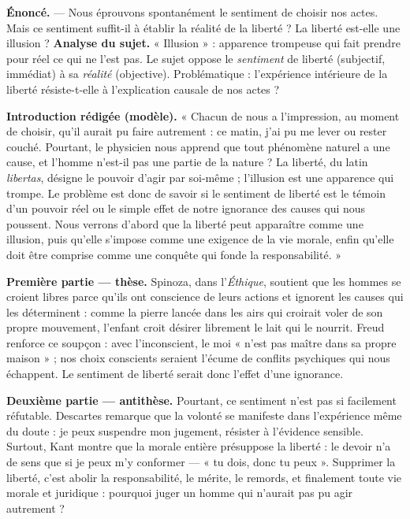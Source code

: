 \documentclass[11pt]{article}
\begin{document}
\begin{exoresolu}
\textbf{Énoncé.} — Nous éprouvons spontanément le sentiment de choisir nos actes. Mais ce sentiment suffit-il à établir la réalité de la liberté ? La liberté est-elle une illusion ?
\tcblower
\textbf{Analyse du sujet.} « Illusion » : apparence trompeuse qui fait prendre pour réel ce qui ne l'est pas. Le sujet oppose le \emph{sentiment} de liberté (subjectif, immédiat) à sa \emph{réalité} (objective). Problématique : l'expérience intérieure de la liberté résiste-t-elle à l'explication causale de nos actes ?

\textbf{Introduction rédigée (modèle).} « Chacun de nous a l'impression, au moment de choisir, qu'il aurait pu faire autrement : ce matin, j'ai pu me lever ou rester couché. Pourtant, le physicien nous apprend que tout phénomène naturel a une cause, et l'homme n'est-il pas une partie de la nature ? La liberté, du latin \emph{libertas}, désigne le pouvoir d'agir par soi-même ; l'illusion est une apparence qui trompe. Le problème est donc de savoir si le sentiment de liberté est le témoin d'un pouvoir réel ou le simple effet de notre ignorance des causes qui nous poussent. Nous verrons d'abord que la liberté peut apparaître comme une illusion, puis qu'elle s'impose comme une exigence de la vie morale, enfin qu'elle doit être comprise comme une conquête qui fonde la responsabilité. »

\textbf{Première partie — thèse.} Spinoza, dans l'\emph{Éthique}, soutient que les hommes se croient libres parce qu'ils ont conscience de leurs actions et ignorent les causes qui les déterminent : comme la pierre lancée dans les airs qui croirait voler de son propre mouvement, l'enfant croit désirer librement le lait qui le nourrit. Freud renforce ce soupçon : avec l'inconscient, le moi « n'est pas maître dans sa propre maison » ; nos choix conscients seraient l'écume de conflits psychiques qui nous échappent. Le sentiment de liberté serait donc l'effet d'une ignorance.

\textbf{Deuxième partie — antithèse.} Pourtant, ce sentiment n'est pas si facilement réfutable. Descartes remarque que la volonté se manifeste dans l'expérience même du doute : je peux suspendre mon jugement, résister à l'évidence sensible. Surtout, Kant montre que la morale entière présuppose la liberté : le devoir n'a de sens que si je peux m'y conformer — « tu dois, donc tu peux ». Supprimer la liberté, c'est abolir la responsabilité, le mérite, le remords, et finalement toute vie morale et juridique : pourquoi juger un homme qui n'aurait pas pu agir autrement ?


\end{exoresolu}
\end{document}
